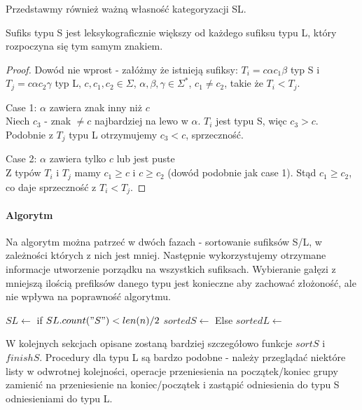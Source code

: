 Przedstawmy również ważną własność kategoryzacji SL.

\begin{lemma}{}{}
\label{SL_order}
Sufiks typu S jest leksykograficznie większy od każdego sufiksu typu L, który rozpoczyna się tym samym znakiem.
\end{lemma}
\begin{proof}
Dowód nie wprost - załóżmy że istnieją sufiksy: $T_i = c \alpha c_1 \beta$ typ S i $T_j = c\alpha c_2 \gamma$ typ L, $c, c_1, c_2 \in \Sigma$, $\alpha, \beta, \gamma \in \Sigma^*$, $c_1 \neq c_2$, takie że $T_i < T_j$.

\item[Case 1:] $\alpha$ zawiera znak inny niż $c$\\
Niech $c_3$ - znak $\neq c$ najbardziej na lewo w $\alpha$. $T_i$ jest typu S, więc $c_3>c$. Podobnie z $T_j$ typu L otrzymujemy $c_3<c$, sprzeczność.

\item[Case 2:] $\alpha$ zawiera tylko $c$ lub jest puste\\
Z typów $T_i$ i $T_j$ mamy $c_1 \geq c$ i $c \geq c_2$ (dowód podobnie jak case 1). Stąd $c_1 \geq c_2$, co daje sprzeczność z $T_i < T_j$.

\end{proof}

\paragraph{Algorytm}

Na algorytm można patrzeć w dwóch fazach - sortowanie sufiksów S/L, w zależności których z nich jest mniej. Następnie wykorzystujemy otrzymane informacje utworzenie porządku na wszystkich sufiksach. Wybieranie gałęzi z mniejszą ilością prefiksów danego typu jest konieczne aby zachować złożoność, ale nie wpływa na poprawność algorytmu.

\begin{algorithmic}
\State $SL \gets$ 
\State if $SL.count("S") < len(n)/2$
	\State $sortedS \gets$ 
	\State \Return {}
\State Else
	\State $sortedL \gets$ 
	\State \Return {}
\EndProcedure
\end{algorithmic}

W kolejnych sekcjach opisane zostaną bardziej szczegółowo funkcje $sortS$ i $finishS$. Procedury dla typu L są bardzo podobne - należy przeglądać niektóre listy w odwrotnej kolejności, operacje przeniesienia na początek/koniec grupy zamienić na przeniesienie na koniec/początek i zastąpić odniesienia do typu S odniesieniami do typu L.

